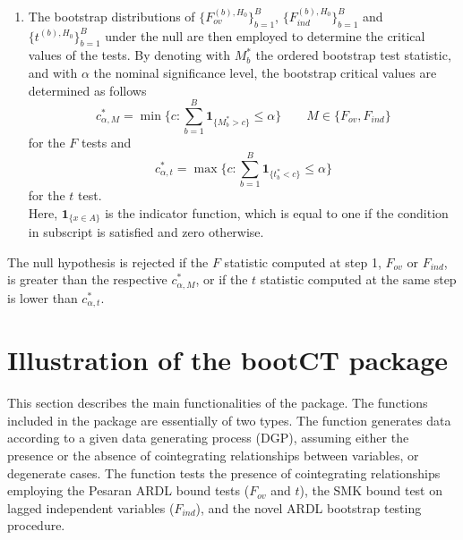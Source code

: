 \begin{enumerate}
\item The bootstrap distributions of $\big\{F_{ov}^{(b),H_0}\big\}_{b=1}^B$, $\big\{F_{ind}^{(b),H_0}\big\}_{b=1}^B$ and $\big\{t^{(b),H_0}\big\}_{b=1}^B$ under the null are then employed to determine the critical values of the tests. By denoting with $M^*_b$ the ordered bootstrap test statistic, and with $\alpha$ the nominal significance level, the bootstrap critical values are determined as follows 
 \begin{equation}\label{eq:bootf}
c^*_{\alpha,M}=\min\bigg\{c:\sum_{b=1}^{B}\mathbf{1}_{\{M^*_b >c\}}	\leq\alpha\bigg\}
\qquad M\in\{F_{ov},F_{ind}\}\end{equation}
for the $F$ tests and 
\begin{equation}\label{eq:boott}
c^*_{{\alpha,t}}=\max\bigg\{c:\sum_{b=1}^{B}\mathbf{1}_{\{t^*_b<c\}}	\leq {\alpha}\bigg\}
\end{equation}
for the $t$ test.\\
Here, $\mathbf{1}_{\{x \in A\}}$ is the indicator function, which is equal to one if the condition in subscript is satisfied and zero otherwise. 
\end{enumerate}
The null hypothesis is rejected if the $F$ statistic computed at step 1, $F_{ov}$ or $F_{ind}$, is greater than the respective $c^*_{\alpha,M}$, or if the $t$ statistic computed at the same step is lower than $c^*_{{\alpha,t}}$.

\section{Illustration of the bootCT package}\label{sec:pkg}
This section describes the main functionalities of the  package. The functions included in the package are essentially of two types. The function  generates data according to a given data generating process (DGP), assuming either the presence or the absence of cointegrating relationships between variables, or degenerate cases. The function  tests the presence of cointegrating relationships employing the Pesaran ARDL bound tests ($F_{ov}$ and $t$), the SMK bound test on lagged independent variables ($F_{ind}$), and the novel ARDL bootstrap testing procedure.

